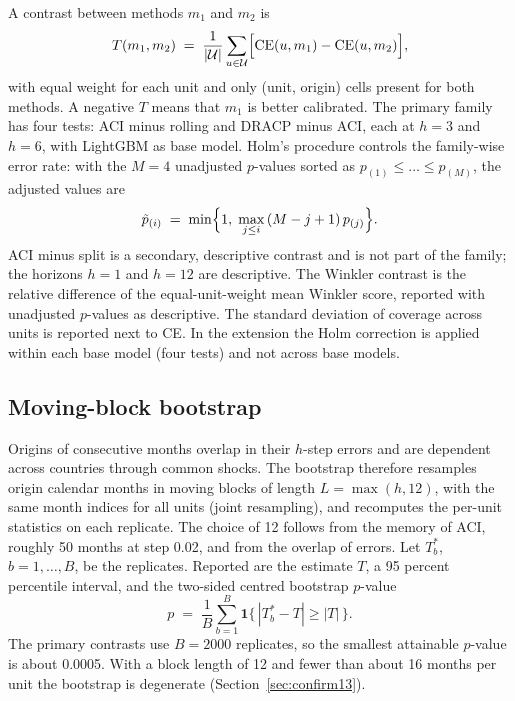 A contrast between methods $m_1$ and $m_2$ is
\begin{equation}\label{eq:contrast}
T(m_1,m_2) \;=\; \frac{1}{|\mathcal U|}\sum_{u\in\mathcal U}\Bigl[\mathrm{CE}(u,m_1)-\mathrm{CE}(u,m_2)\Bigr],
\end{equation}
with equal weight for each unit and only (unit, origin) cells present for both methods. A negative $T$ means that $m_1$ is better calibrated. The primary family has four tests: ACI minus rolling and DRACP minus ACI, each at $h=3$ and $h=6$, with LightGBM as base model. Holm's procedure \citep{holm1979} controls the family-wise error rate: with the $M=4$ unadjusted $p$-values sorted as $p_{(1)}\le\dots\le p_{(M)}$, the adjusted values are
\begin{equation}\label{eq:holm}
\tilde p_{(i)} \;=\; \min\Bigl\{1,\;\max_{j\le i}\,(M-j+1)\,p_{(j)}\Bigr\}.
\end{equation}
ACI minus split is a secondary, descriptive contrast and is not part of the family; the horizons $h=1$ and $h=12$ are descriptive. The Winkler contrast is the relative difference of the equal-unit-weight mean Winkler score, reported with unadjusted $p$-values as descriptive. The standard deviation of coverage across units is reported next to CE. In the extension the Holm correction is applied within each base model (four tests) and not across base models.

\subsection{Moving-block bootstrap}\label{sec:bootstrap}

Origins of consecutive months overlap in their $h$-step errors and are dependent across countries through common shocks. The bootstrap therefore resamples origin calendar months in moving blocks \citep{kunsch1989} of length $L=\max(h,12)$, with the same month indices for all units (joint resampling), and recomputes the per-unit statistics on each replicate. The choice of 12 follows from the memory of ACI, roughly 50 months at step 0.02, and from the overlap of errors. Let $T^{*}_b$, $b=1,\dots,B$, be the replicates. Reported are the estimate $T$, a 95 percent percentile interval, and the two-sided centred bootstrap $p$-value
\begin{equation}\label{eq:pboot}
p \;=\; \frac{1}{B}\sum_{b=1}^{B}\mathbf 1\bigl\{\,|T^{*}_b-T|\ge |T|\,\bigr\}.
\end{equation}
The primary contrasts use $B=2000$ replicates, so the smallest attainable $p$-value is about 0.0005. With a block length of 12 and fewer than about 16 months per unit the bootstrap is degenerate (Section~\ref{sec:confirm13}).

